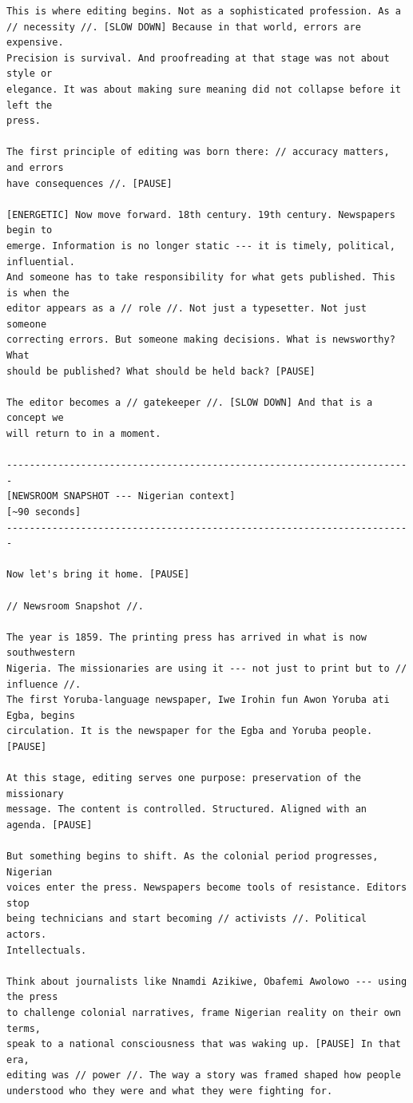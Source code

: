 {\begin{Verbatim}
This is where editing begins. Not as a sophisticated profession. As a
// necessity //. [SLOW DOWN] Because in that world, errors are expensive.
Precision is survival. And proofreading at that stage was not about style or
elegance. It was about making sure meaning did not collapse before it left the
press.

The first principle of editing was born there: // accuracy matters, and errors
have consequences //. [PAUSE]

[ENERGETIC] Now move forward. 18th century. 19th century. Newspapers begin to
emerge. Information is no longer static --- it is timely, political, influential.
And someone has to take responsibility for what gets published. This is when the
editor appears as a // role //. Not just a typesetter. Not just someone
correcting errors. But someone making decisions. What is newsworthy? What
should be published? What should be held back? [PAUSE]

The editor becomes a // gatekeeper //. [SLOW DOWN] And that is a concept we
will return to in a moment.

-----------------------------------------------------------------------
[NEWSROOM SNAPSHOT --- Nigerian context]
[~90 seconds]
-----------------------------------------------------------------------

Now let's bring it home. [PAUSE]

// Newsroom Snapshot //.

The year is 1859. The printing press has arrived in what is now southwestern
Nigeria. The missionaries are using it --- not just to print but to // influence //.
The first Yoruba-language newspaper, Iwe Irohin fun Awon Yoruba ati Egba, begins
circulation. It is the newspaper for the Egba and Yoruba people. [PAUSE]

At this stage, editing serves one purpose: preservation of the missionary
message. The content is controlled. Structured. Aligned with an agenda. [PAUSE]

But something begins to shift. As the colonial period progresses, Nigerian
voices enter the press. Newspapers become tools of resistance. Editors stop
being technicians and start becoming // activists //. Political actors.
Intellectuals.

Think about journalists like Nnamdi Azikiwe, Obafemi Awolowo --- using the press
to challenge colonial narratives, frame Nigerian reality on their own terms,
speak to a national consciousness that was waking up. [PAUSE] In that era,
editing was // power //. The way a story was framed shaped how people
understood who they were and what they were fighting for.


\end{Verbatim}}
